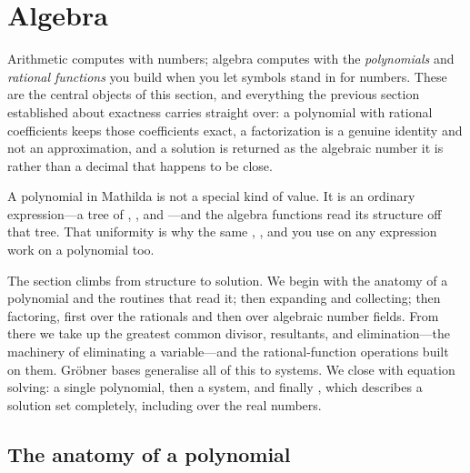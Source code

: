 \section{Algebra}
\label{sec:algebra}

Arithmetic computes with numbers; algebra computes with the \emph{polynomials} and
\emph{rational functions} you build when you let symbols stand
in for numbers. These are the central objects of this section, and everything the
previous section established about exactness carries straight over: a polynomial with
rational coefficients keeps those coefficients exact, a factorization is a genuine
identity and not an approximation, and a solution is returned as the algebraic number it
is rather than a decimal that happens to be close.

A polynomial in Mathilda is not a special kind of value. It is an ordinary
expression---a tree of , , and ---and the algebra functions
read its structure off that tree. That
uniformity is why the same , , and  you use on any
expression work on a polynomial too.

The section climbs from structure to solution. We begin with the anatomy of a
polynomial and the routines that read it; then expanding and collecting; then factoring,
first over the rationals and then over algebraic number fields. From there we take up
the greatest common divisor, resultants, and elimination---the machinery of eliminating
a variable---and the rational-function operations built on them. Gr\"obner bases
generalise all of this to systems. We close with equation solving: a single polynomial,
then a system, and finally , which describes a solution set completely,
including over the real numbers.

\subsection{The anatomy of a polynomial}
\label{ssec:alg-polynomials}


